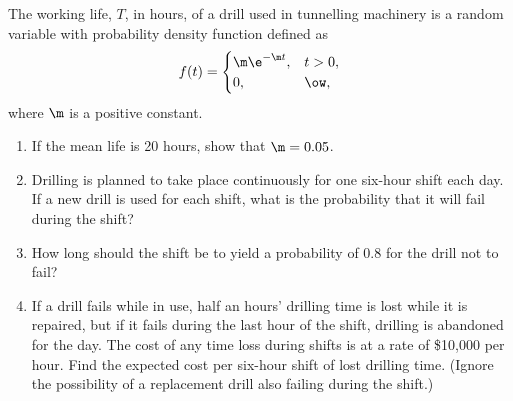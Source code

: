 \begin{problem}
    The working life, $T$, in hours, of a drill used in tunnelling machinery is a random variable with probability density function defined as \[f(t) = \begin{cases}
        \m \e^{-\m t}, & t > 0,\\
        0, & \ow,
    \end{cases}\] where $\m$ is a positive constant.

    \begin{enumerate}
        \item If the mean life is 20 hours, show that $\m=0.05$.
        \item Drilling is planned to take place continuously for one six-hour shift each day. If a new drill is used for each shift, what is the probability that it will fail during the shift?
        \item How long should the shift be to yield a probability of $0.8$ for the drill not to fail?
        \item If a drill fails while in use, half an hours' drilling time is lost while it is repaired, but if it fails during the last hour of the shift, drilling is abandoned for the day. The cost of any time loss during shifts is at a rate of \$10,000 per hour. Find the expected cost per six-hour shift of lost drilling time. (Ignore the possibility of a replacement drill also failing during the shift.)
    \end{enumerate}
\end{problem}
